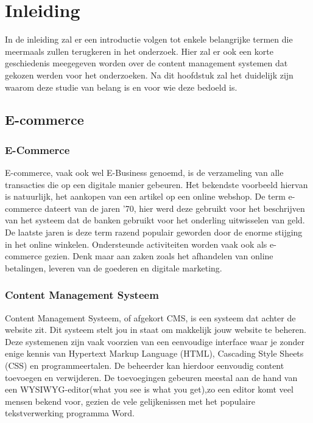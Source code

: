 
\chapter{Inleiding}
\label{ch:inleiding}
In de inleiding zal er een introductie volgen tot enkele belangrijke termen die meermaals zullen terugkeren in het onderzoek. Hier zal er ook een korte geschiedenis meegegeven worden over de content management systemen dat gekozen werden voor het onderzoeken. Na dit hoofdstuk zal het duidelijk zijn waarom deze studie van belang is en voor wie deze bedoeld is.

\section{E-commerce}
\label{sec:E-commerce}
\subsection{E-Commerce}
E-commerce, vaak ook wel E-Business genoemd, is de verzameling van alle transacties die op een digitale manier gebeuren. Het bekendste voorbeeld hiervan is natuurlijk, het aankopen van een artikel op een online webshop. De term e-commerce dateert van de jaren '70, hier werd deze gebruikt voor het beschrijven van het systeem dat de banken gebruikt voor het onderling uitwisselen van geld. De laatste jaren is deze term razend populair geworden door de enorme stijging in het online winkelen. Ondersteunde activiteiten worden vaak ook als e-commerce gezien. Denk maar aan zaken zoals het afhandelen van online betalingen, leveren van de goederen en digitale marketing. \autocite{MarketingTermen2018}

\subsection{Content Management Systeem}
Content Management Systeem, of afgekort CMS, is een systeem dat achter de website zit. Dit systeem stelt jou in staat om makkelijk jouw website te beheren. Deze systemenen zijn vaak voorzien van een eenvoudige interface waar je zonder enige kennis van Hypertext Markup Language (HTML), Cascading Style Sheets (CSS) en programmeertalen. De beheerder kan hierdoor eenvoudig content toevoegen en verwijderen. De toevoegingen gebeuren meestal aan de hand van een WYSIWYG-editor(what you see is what you get),zo een editor komt veel mensen bekend voor, gezien de vele gelijkenissen met het populaire tekstverwerking programma Word. \autocite{forresult2014,wphandleiding2015}


